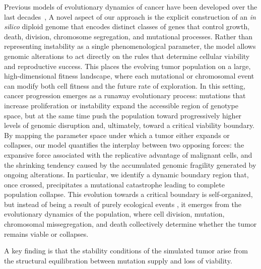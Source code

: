 \documentclass[10pt, aps, rmp,  twocolumn, superscriptaddress, floatfix, showkeys]{revtex4-2}
\begin{document}
Previous models of evolutionary dynamics of cancer have been developed over the last decades~\cite{Sole2003-ne,Sole2004-bf,Sardanyes2017JMB,Sardanyes2018SciRep}, 
A novel aspect of our approach is the explicit construction of an \textit{in silico} diploid genome that encodes distinct classes of genes that control growth, death, division, chromosome segregation, and mutational processes. Rather than representing instability as a single phenomenological parameter, the model allows genomic alterations to act directly on the rules that determine cellular viability and reproductive success. This places the evolving tumor population on a large, high-dimensional fitness landscape, where each mutational or chromosomal event can modify both cell fitness and the future rate of exploration. In this setting, cancer progression emerges as a runaway evolutionary process: mutations that increase proliferation or instability expand the accessible region of genotype space, but at the same time push the population toward progressively higher levels of genomic disruption and, ultimately, toward a critical viability boundary. By mapping the parameter space under which a tumor either expands or collapses, our model quantifies the interplay between two opposing forces: the expansive force associated with the replicative advantage of malignant cells, and the shrinking tendency caused by the accumulated genomic fragility generated by ongoing alterations. In particular, we identify a dynamic boundary region that, once crossed, precipitates a mutational catastrophe leading to complete population collapse. This evolution towards a critical boundary is self-organized, but instead of being a result of purely ecological events \cite{sole2002self}, it emerges from the evolutionary dynamics of the population, where cell division, mutation, chromosomal missegregation, and death collectively determine whether the tumor remains viable or collapses.

A key finding is that the stability conditions of the simulated tumor arise from the structural equilibration between mutation supply and loss of viability. 
\end{document}
